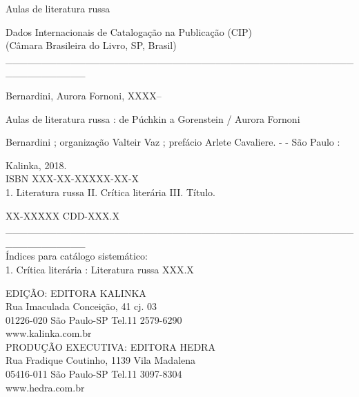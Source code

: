 \newpage
\MyriadPro
\begin{center}
\small
Aulas de literatura russa
\end{center}

\scriptsize

\begin{vplace}[1]
\begin{center}
Dados Internacionais de Catalogação na Publicação (CIP)\\
(Câmara Brasileira do Livro, SP, Brasil)\\
\_\_\_\_\_\_\_\_\_\_\_\_\_\_\_\_\_\_\_\_\_\_\_\_\_\_\_\_\_\_\_\_\_\_\_\_\_\_\_\_\_\_\_\_\_\_\_\_\_\_\_\_\_\_\_\_\_\_\_\\
\end{center}
\hspace{30pt}Bernardini, Aurora Fornoni, XXXX--


\hspace{35pt}Aulas de literatura russa : de Púchkin a Gorenstein / Aurora Fornoni

\hspace{12pt}Bernardini ; organização Valteir Vaz ; prefácio Arlete Cavaliere. - - São Paulo :

\hspace{12pt}Kalinka, 2018.\\[6pt]

\hspace{35pt}ISBN XXX-XX-XXXXX-XX-X\\[6pt]

\hspace{35pt}1. Literatura russa II. Crítica literária III. Título.

\begin{center}
\hspace{10pt}XX-XXXXX \hspace{180pt}CDD-XXX.X
\_\_\_\_\_\_\_\_\_\_\_\_\_\_\_\_\_\_\_\_\_\_\_\_\_\_\_\_\_\_\_\_\_\_\_\_\_\_\_\_\_\_\_\_\_\_\_\_\_\_\_\_\_\_\_\_\_\_\_\\
Índices para catálogo sistemático:\\[3pt]
1. Crítica literária : Literatura russa XXX.X\\
\end{center}
\end{vplace}

\begin{center}
EDIÇÃO: EDITORA KALINKA\\[7pt]
Rua Imaculada Conceição, 41 cj. 03\\[7pt]
01226-020 São Paulo-SP Tel.11 2579-6290\\[7pt]
www.kalinka.com.br\\[30pt]

PRODUÇÃO EXECUTIVA: EDITORA HEDRA\\[7pt]
Rua Fradique Coutinho, 1139 Vila Madalena\\[7pt]
05416-011 São Paulo-SP Tel.11 3097-8304\\[7pt]
www.hedra.com.br
\end{center}

